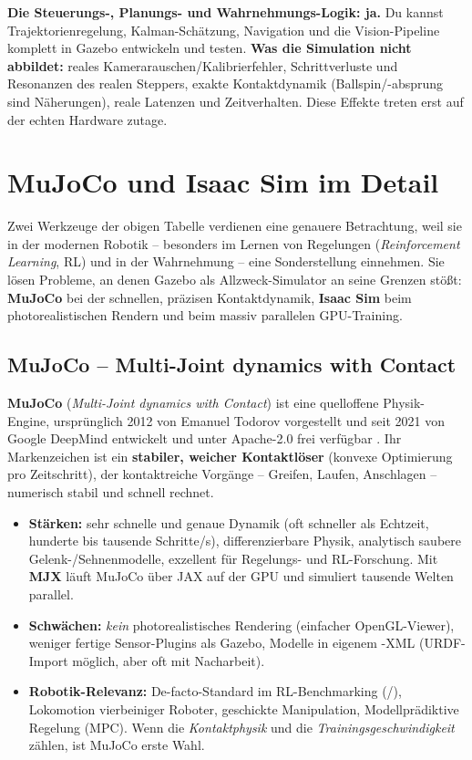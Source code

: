\begin{infobox}[title=Kannst du die Projekte vollständig in Simulation umsetzen?]
\textbf{Die Steuerungs-, Planungs- und Wahrnehmungs-Logik: ja.} Du kannst
Trajektorienregelung, Kalman-Schätzung, Navigation und die Vision-Pipeline
komplett in Gazebo entwickeln und testen. \textbf{Was die Simulation nicht
abbildet:} reales Kamerarauschen/Kalibrierfehler, Schrittverluste und
Resonanzen des realen Steppers, exakte Kontaktdynamik (Ballspin/-absprung sind
Näherungen), reale Latenzen und Zeitverhalten. Diese Effekte treten erst auf
der echten Hardware zutage.
\end{infobox}

\section{MuJoCo und Isaac Sim im Detail}
Zwei Werkzeuge der obigen Tabelle verdienen eine genauere Betrachtung, weil sie
in der modernen Robotik -- besonders im Lernen von Regelungen
(\emph{Reinforcement Learning}, RL) und in der Wahrnehmung -- eine
Sonderstellung einnehmen. Sie lösen Probleme, an denen Gazebo als
Allzweck-Simulator an seine Grenzen stößt: \textbf{MuJoCo} bei der schnellen,
präzisen Kontaktdynamik, \textbf{Isaac Sim} beim photorealistischen Rendern und
beim massiv parallelen GPU-Training.

\subsection{MuJoCo -- Multi-Joint dynamics with Contact}
\textbf{MuJoCo} (\emph{Multi-Joint dynamics with Contact}) ist eine
quelloffene Physik-Engine, ursprünglich 2012 von Emanuel Todorov vorgestellt
\cite{todorov2012mujoco} und seit 2021 von Google DeepMind entwickelt und unter
Apache-2.0 frei verfügbar \cite{mujoco_docs}. Ihr Markenzeichen ist ein
\textbf{stabiler, weicher Kontaktlöser} (konvexe Optimierung pro Zeitschritt),
der kontaktreiche Vorgänge -- Greifen, Laufen, Anschlagen -- numerisch stabil
und schnell rechnet.

\begin{itemize}
\item \textbf{Stärken:} sehr schnelle und genaue Dynamik (oft schneller als
  Echtzeit, hunderte bis tausende Schritte/s), differenzierbare Physik,
  analytisch saubere Gelenk-/Sehnenmodelle, exzellent für Regelungs- und
  RL-Forschung. Mit \textbf{MJX} läuft MuJoCo über JAX auf der GPU und
  simuliert tausende Welten parallel.
\item \textbf{Schwächen:} \emph{kein} photorealistisches Rendering (einfacher
  OpenGL-Viewer), weniger fertige Sensor-Plugins als Gazebo, Modelle in eigenem
  -XML (URDF-Import möglich, aber oft mit Nacharbeit).
\item \textbf{Robotik-Relevanz:} De-facto-Standard im RL-Benchmarking
  (/), Lokomotion vierbeiniger Roboter,
  geschickte Manipulation, Modellprädiktive Regelung (MPC). Wenn die
  \emph{Kontaktphysik} und die \emph{Trainingsgeschwindigkeit} zählen, ist
  MuJoCo erste Wahl.
\end{itemize}

